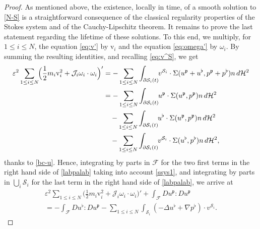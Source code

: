 \documentclass[JEP,XML,SOM,Unicode, NoEqCountersInSection,NoFloatCountersInSection,published]{cedram}
\let\eps\varepsilon
\newcommand{\dd}{\,d}
\theoremstyle{definition}
\theoremstyle{remark}
\begin{document}
\begin{proof}
As mentioned above, the existence, locally in time, of a smooth solution to \eqref{N-S} is a straightforward consequence of the classical regularity properties of the Stokes system and of the Cauchy-Lipschitz theorem. It remains to prove
the last statement regarding the lifetime of these solutions.
To this end, we multiply, for $ 1\leq i \leq N$,
the equation \eqref{eq:v'} by
$\textrm{v}_i $ and the equation
\eqref{eq:omega'} by $\omega_i$.
By summing the resulting identities, and recalling \eqref{eq:v^S}, we get
\begin{equation}
\begin{aligned}
\eps^2 \sum_{1\leq i \leq N}\hspace*{-1mm} \Big(\frac12 m_i \textrm{v}_i^2
+ \mathcal{J}_i \omega_i \cdot \omega_i \Big)'
&=- \sum_{1\leq i \leq N} \int_{\partial \mathcal S_i (t)}\hspace*{-1mm} v^{{\mathcal S}_i}
\cdot \Sigma(u^\mathfrak{p} + u^\flat,p^\mathfrak{p} + p^\flat) n \dd\mathcal{H}^2
\\
&=- \sum_{1\leq i \leq N} \int_{\partial \mathcal S_i (t)}\hspace*{-1mm} u^\mathfrak{p}
\cdot \Sigma(u^\mathfrak{p},p^\mathfrak{p}) n \dd\mathcal{H}^2 \\
&\quad - \sum_{1\leq i \leq N} \int_{\partial \mathcal S_i (t)}\hspace*{-1mm} u^\flat
\cdot \Sigma(u^\mathfrak{p},p^\mathfrak{p}) n \dd\mathcal{H}^2
\\ &\quad - \sum_{1\leq i \leq N} \int_{\partial \mathcal S_i (t)}\hspace*{-1mm} v^{{\mathcal S}_i}
\cdot \Sigma(u^\flat,p^\flat) n \dd\mathcal{H}^2,
\label{labpalab}
\end{aligned}
\end{equation}
thanks to \eqref{bc-u}.
Hence, integrating by parts
in ${\mathcal F}$ for the two first terms in the right hand side of \eqref{labpalab}
taking into account \eqref{ssys1}, and integrating by parts in $\bigcup_i {\mathcal S}_i$ for the last term in the right hand side of \eqref{labpalab}, we arrive at
\begin{multline} \label{nrj}
\eps^2 \sum_{1\leq i \leq N} \Big(\frac12 m_i \textrm{v}_i^2
+ \mathcal{J}_i \omega_i \cdot \omega_i \Big)' + \int_{\mathcal F} D u^\mathfrak{p} : D u^\mathfrak{p}\\
=- \int_{\mathcal F} D u^\flat : D u^\mathfrak{p}
- \sum_{1 \leq i \leq N} \int_{\mathcal S_i} (-\Delta u^\flat + \nabla p^\flat) \cdot v^{{\mathcal S}_i}.

\end{multline}
\end{proof}
\end{document}
